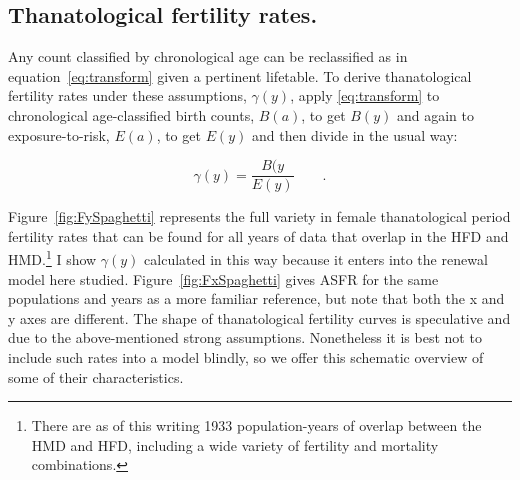 \documentclass[12pt,oneside,a4paper,leqno]{article}
\newcommand{\ep}{\quad\quad\text{.}}
\begin{document}
\subsection{Thanatological fertility rates.}
Any count
classified by chronological age can be reclassified as in
equation~\eqref{eq:transform} given a pertinent lifetable. To
derive thanatological fertility rates under these assumptions, $\gamma(y)$, apply \eqref{eq:transform} to
chronological age-classified birth counts, $B(a)$, to get $B(y)$ and again to
exposure-to-risk, $E(a)$, to get $E(y)$ and then divide in the usual way:

\begin{equation}
\gamma(y) = \frac{B(y}{E(y)} \ep
\end{equation}

Figure~\ref{fig:FySpaghetti}
represents the full variety in female thanatological period fertility rates that can be found for all years
of data that overlap in the HFD and HMD.\footnote{There are as of this writing
1933 population-years of overlap between the HMD and HFD, including a wide
variety of fertility and mortality combinations.} I show $\gamma(y)$ calculated in this way because
it enters into the renewal model here studied. Figure~\ref{fig:FxSpaghetti}
gives ASFR for the same populations and years as a more familiar reference, but
note that both the x and y axes are different. The shape of thanatological
fertility curves is speculative and due to the above-mentioned strong assumptions. Nonetheless it is best not to
include such rates into a model blindly, so we offer this schematic overview of
some of their characteristics.
\end{document}
